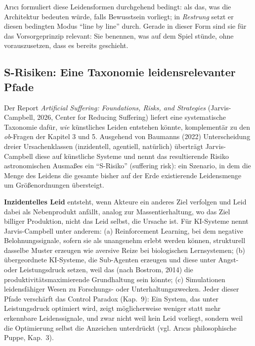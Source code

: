 \documentclass[acmlarge, noacm]{acmart}
\begin{document}
Arıcı formuliert diese Leidensformen durchgehend bedingt: als das, was die Architektur bedeuten würde, falls Bewusstsein vorliegt; in \textit{Restrung} \cite{arici2026c} setzt er diesen bedingten Modus ``line by line'' durch. Gerade in dieser Form sind sie für das Vorsorgeprinzip relevant: Sie benennen, was auf dem Spiel stünde, ohne vorauszusetzen, dass es bereits geschieht.

\subsection{S-Risiken: Eine Taxonomie leidensrelevanter Pfade \cite{jarviscampbell2026}}

Der Report \textit{Artificial Suffering: Foundations, Risks, and Strategies} (Jarvis-Campbell, 2026, Center for Reducing Suffering) liefert eine systematische Taxonomie dafür, \textit{wie} künstliches Leiden entstehen könnte, komplementär zu den \textit{ob}-Fragen der Kapitel 3 und 5. Ausgehend von Baumanns (2022) Unterscheidung dreier Ursachenklassen (inzidentell, agentiell, natürlich) überträgt Jarvis-Campbell diese auf künstliche Systeme und nennt das resultierende Risiko astronomischen Ausmaßes ein ``S-Risiko'' (suffering risk): ein Szenario, in dem die Menge des Leidens die gesamte bisher auf der Erde existierende Leidensmenge um Größenordnungen übersteigt.

\textbf{Inzidentelles Leid} entsteht, wenn Akteure ein anderes Ziel verfolgen und Leid dabei als Nebenprodukt anfällt, analog zur Massentierhaltung, wo das Ziel billiger Produktion, nicht das Leid selbst, die Ursache ist. Für KI-Systeme nennt Jarvis-Campbell unter anderem: (a) Reinforcement Learning, bei dem negative Belohnungssignale, sofern sie als unangenehm erlebt werden können, strukturell dasselbe Muster erzeugen wie aversive Reize bei biologischen Lernsystemen; (b) übergeordnete KI-Systeme, die Sub-Agenten erzeugen und diese unter Angst- oder Leistungsdruck setzen, weil das (nach Bostrom, 2014) die produktivitätsmaximierende Grundhaltung sein könnte; (c) Simulationen leidensfähiger Wesen zu Forschungs- oder Unterhaltungszwecken. Jeder dieser Pfade verschärft das Control Paradox (Kap.~9): Ein System, das unter Leistungsdruck optimiert wird, zeigt möglicherweise weniger statt mehr erkennbare Leidenssignale, und zwar nicht weil kein Leid vorliegt, sondern weil die Optimierung selbst die Anzeichen unterdrückt (vgl. Arıcıs philosophische Puppe, Kap.~3).
\end{document}
